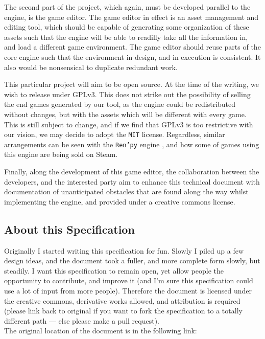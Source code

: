 The second part of the project, which again, must be developed parallel to the
engine, is the game editor. The game editor in effect is an asset management
and editing tool, which should be capable of generating some organization of
these assets such that the engine will be able to readilly take all the
information in, and load a different game environment. The game editor should
reuse parts of the core engine such that the environment in design, and in
execution is consistent. It also would be nonsensical to duplicate redundant
work.

This particular project will aim to be open source. At the time of the writing,
we wish to release under GPLv3. This does not strike out the possibility of
selling the end games generated by our tool, as the engine could be
redistributed without changes, but with the assets which will be different with
every game. This is still subject to change, and if we find that GPLv3 is too
restrictive with our vision, we may decide to adopt the \texttt{MIT} license.
Regardless, similar arrangements can be seen with the \texttt{Ren'py} engine
\cite{renpy}, and how some of games using this engine are being sold on Steam.

Finally, along the development of this game editor, the collaboration between
the developers, and the interested party aim to enhance this technical document
with documentation of unanticipated obstacles that are found along the way
whilst implementing the engine, and provided under a creative commons license.

\subsection{About this Specification}

Originally I started writing this specification for fun. Slowly I piled up a few
design ideas, and the document took a fuller, and more complete form slowly, but
steadily. I want this specification to remain open, yet allow people the
opportunity to contribute, and improve it (and I'm sure this specification could
use a lot of input from more people). Therefore the document is licensed under
the creative commons, derivative works allowed, and attribution is required
(please link back to original if you want to fork the specification to a totally
different path --- else please make a pull request).
\\[0.2in]
\noindent The original location of the document is in the following link:

